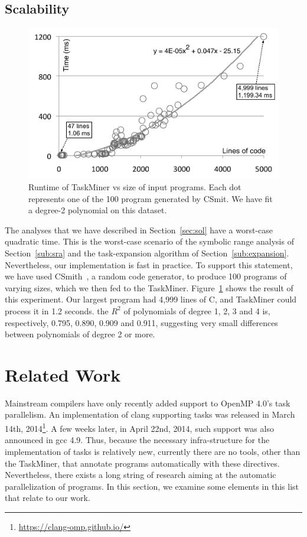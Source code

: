 \documentclass[sigplan,10pt,review,anonymous]{acmart}
\newcommand\Taskminer{\mbox{\textsf{TaskMiner}}}
\begin{document}
\subsection{Scalability}
\label{sub:scalability}

\begin{figure}[htb]
\begin{center}
\includegraphics[width=0.9\columnwidth]{images/TM_Runtime}
\caption{Runtime of \Taskminer{} vs size of input programs.
Each dot represents one of the 100 program generated by \textsf{CSmit}.
We have fit a degree-2 polynomial on this dataset.}
\label{fig:TM_Runtime}
\end{center}
\end{figure}

The analyses that we have described in Section~\ref{sec:sol} have a worst-case
quadratic time.
This is the worst-case scenario of the symbolic range analysis of
Section~\ref{sub:sra} and the task-expansion algorithm of
Section~\ref{sub:expansion}.
Nevertheless, our implementation is fast in practice.
To support this statement, we have used \textsf{CSmith}~\cite{Yang11}, a random
code generator, to produce 100 programs of varying sizes, which we then fed to
the \Taskminer.
Figure~\ref{fig:TM_Runtime} shows the result of this experiment.
Our largest program had 4,999 lines of C, and \Taskminer{} could process it
in 1.2 seconds.
the $R^2$ of polynomials of degree 1, 2, 3 and 4 is, respectively, 0.795,
0.890, 0.909 and 0.911, suggesting very small differences between polynomials
of degree 2 or more.

\section{Related Work}
\label{sec:rw}

Mainstream compilers have only recently added support to OpenMP 4.0's task
parallelism.
An implementation of \textsf{clang} supporting tasks was released in March 14th,
2014\footnote{\url{https://clang-omp.github.io/}}.
A few weeks later, in April 22nd, 2014, such support was also announced in
\textsf{gcc} 4.9.
Thus, because the necessary infra-structure for the implementation of tasks is
relatively new, currently there are no tools, other than the \Taskminer,
that annotate programs automatically with these directives.
Nevertheless, there exists a long string of research aiming at the automatic
parallelization of programs.
In this section, we examine some elements in this list that relate to our
work.
\end{document}
